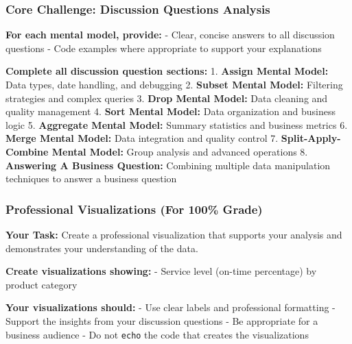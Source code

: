 \documentclass[
  letterpaper,
  DIV=11,
  numbers=noendperiod]{scrartcl}
\begin{document}
\subsubsection{Core Challenge: Discussion Questions
Analysis}\label{core-challenge-discussion-questions-analysis}

\textbf{For each mental model, provide:} - Clear, concise answers to all
discussion questions - Code examples where appropriate to support your
explanations

\begin{tcolorbox}[enhanced jigsaw, colframe=quarto-callout-important-color-frame, title=\textcolor{quarto-callout-important-color}{\faExclamation}\hspace{0.5em}{📊 Discussion Questions Requirements}, breakable, opacityback=0, arc=.35mm, leftrule=.75mm, titlerule=0mm, left=2mm, toptitle=1mm, rightrule=.15mm, bottomtitle=1mm, bottomrule=.15mm, opacitybacktitle=0.6, toprule=.15mm, colback=white, coltitle=black, colbacktitle=quarto-callout-important-color!10!white]

\textbf{Complete all discussion question sections:} 1. \textbf{Assign
Mental Model:} Data types, date handling, and debugging 2.
\textbf{Subset Mental Model:} Filtering strategies and complex queries
3. \textbf{Drop Mental Model:} Data cleaning and quality management 4.
\textbf{Sort Mental Model:} Data organization and business logic 5.
\textbf{Aggregate Mental Model:} Summary statistics and business metrics
6. \textbf{Merge Mental Model:} Data integration and quality control 7.
\textbf{Split-Apply-Combine Mental Model:} Group analysis and advanced
operations 8. \textbf{Answering A Business Question:} Combining multiple
data manipulation techniques to answer a business question

\end{tcolorbox}

\subsubsection{Professional Visualizations (For 100\%
Grade)}\label{professional-visualizations-for-100-grade}

\textbf{Your Task:} Create a professional visualization that supports
your analysis and demonstrates your understanding of the data.

\textbf{Create visualizations showing:} - Service level (on-time
percentage) by product category

\textbf{Your visualizations should:} - Use clear labels and professional
formatting - Support the insights from your discussion questions - Be
appropriate for a business audience - Do not \texttt{echo} the code that
creates the visualizations
\end{document}
